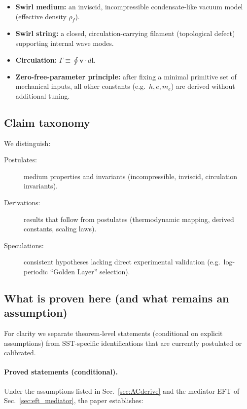 \documentclass[pdflatex,sn-mathphys-num]{revtex4-2}
\newcommand{\rhoF}{\rho_{\!f}}   %
\begin{document}
            \begin{itemize}
                \item \textbf{Swirl medium:} an inviscid, incompressible condensate-like vacuum model (effective density \(\rhoF\)).
                \item \textbf{Swirl string:} a closed, circulation-carrying filament (topological defect) supporting internal wave modes.
                \item \textbf{Circulation:} \(\Gamma \equiv \oint \mathbf{v}\cdot d\mathbf{l}\).
                \item \textbf{Zero-free-parameter principle:} after fixing a minimal primitive set of mechanical inputs, all other
                constants (e.g.\ \(h,e,m_e\)) are derived without additional tuning.
            \end{itemize}

        \subsection{Claim taxonomy}
            We distinguish:
            \begin{description}
                \item[Postulates:] medium properties and invariants (incompressible, inviscid, circulation invariants).
                \item[Derivations:] results that follow from postulates (thermodynamic mapping, derived constants, scaling laws).
                \item[Speculations:] consistent hypotheses lacking direct experimental validation (e.g.\ log-periodic ``Golden Layer'' selection).
            \end{description}

        \subsection{What is proven here (and what remains an assumption)}
        \label{sec:what_proved}

        For clarity we separate theorem-level statements (conditional on explicit assumptions) from SST-specific
        identifications that are currently postulated or calibrated.

        \paragraph{Proved statements (conditional).}
            Under the assumptions listed in Sec.~\ref{sec:ACderive} and the mediator EFT of Sec.~\ref{sec:eft_mediator},
            the paper establishes:
\end{document}
